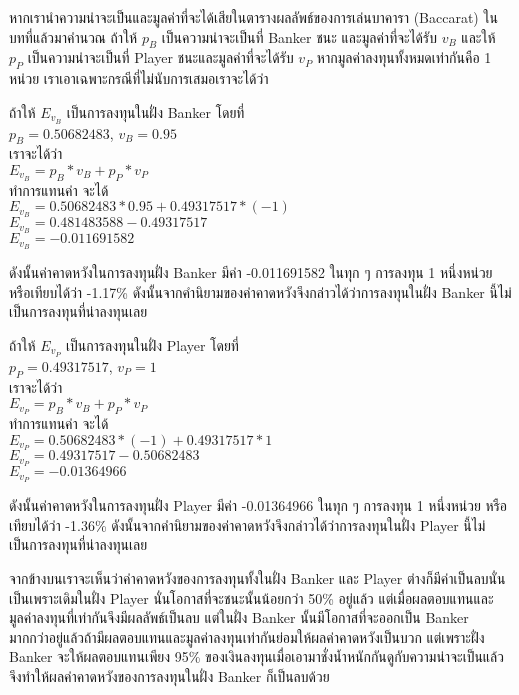 \documentclass[12pt]{article}
\begin{document}
หากเรานำความน่าจะเป็นและมูลค่าที่จะได้เสียในตารางผลลัพธ์ของการเล่นบาคารา (Baccarat) ในบทที่แล้วมาคำนวณ ถ้าให้ $p_B$ เป็นความน่าจะเป็นที่ Banker ชนะ และมูลค่าที่จะได้รับ $v_B$ และให้ $p_P$ เป็นความน่าจะเป็นที่ Player ชนะและมูลค่าที่จะได้รับ $v_P$ หากมูลค่าลงทุนทั้งหมดเท่ากันคือ 1 หน่วย เราเอาเฉพาะกรณีที่ไม่นับการเสมอเราจะได้ว่า 

\begin{center}
ถ้าให้ $E_{v_B}$ เป็นการลงทุนในฝั่ง Banker โดยที่\\
$p_B=0.50682483$, $v_B=0.95$\\
เราจะได้ว่า\\
$E_{v_B}=p_B*v_B+p_P*v_P$\\
ทำการแทนค่า จะได้\\
$E_{v_B}=0.50682483*0.95+0.49317517*(-1)$\\
$E_{v_B}=0.481483588-0.49317517$\\
$E_{v_B}=-0.011691582$\\
\end{center}

ดังนั้นค่าคาดหวังในการลงทุนฝั่ง Banker มีค่า -0.011691582 ในทุก ๆ การลงทุน 1 หนึ่งหน่วย หรือเทียบได้ว่า -1.17\% ดังนั้นจากคำนิยามของค่าคาดหวังจึงกล่าวได้ว่าการลงทุนในฝั่ง Banker นี้ไม่เป็นการลงทุนที่น่าลงทุนเลย 


\begin{center}
ถ้าให้ $E_{v_P}$ เป็นการลงทุนในฝั่ง Player โดยที่\\
$p_P=0.49317517$, $v_P=1$\\
เราจะได้ว่า\\
$E_{v_P}=p_B*v_B+p_P*v_P$\\
ทำการแทนค่า จะได้\\
$E_{v_P}=0.50682483*(-1)+0.49317517*1$\\
$E_{v_P}=0.49317517-0.50682483$\\
$E_{v_P}=-0.01364966$\\
\end{center}

ดังนั้นค่าคาดหวังในการลงทุนฝั่ง Player มีค่า -0.01364966 ในทุก ๆ การลงทุน 1 หนึ่งหน่วย หรือเทียบได้ว่า -1.36\% ดังนั้นจากคำนิยามของค่าคาดหวังจึงกล่าวได้ว่าการลงทุนในฝั่ง Player นี้ไม่เป็นการลงทุนที่น่าลงทุนเลย 

จากข้างบนเราจะเห็นว่าค่าคาดหวังของการลงทุนทั้งในฝั่ง Banker และ Player ต่างก็มีค่าเป็นลบนั่นเป็นเพราะเดิมในฝั่ง Player นั่นโอกาสที่จะชนะนั้นน้อยกว่า 50\% อยู่แล้ว แต่เมื่อผลตอบแทนและมูลค่าลงทุนที่เท่ากันจึงมีผลลัพธ์เป็นลบ แต่ในฝั่ง Banker นั้นมีโอกาสที่จะออกเป็น Banker มากกว่าอยู่แล้วถ้ามีผลตอบแทนและมูลค่าลงทุนเท่ากันย่อมให้ผลค่าคาดหวังเป็นบวก แต่เพราะฝั่ง Banker จะให้ผลตอบแทนเพียง 95\% ของเงินลงทุนเมื่อเอามาชั่งน้ำหนักกันดูกับความน่าจะเป็นแล้วจึงทำให้ผลค่าคาดหวังของการลงทุนในฝั่ง Banker ก็เป็นลบด้วย
\end{document}
